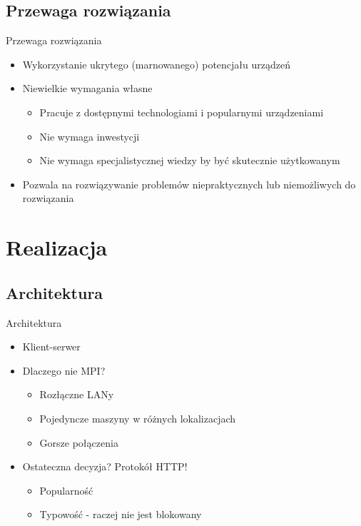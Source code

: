 \documentclass[12pt]{beamer}
\begin{document}
\subsection{Przewaga rozwiązania}
\begin{frame}{Przewaga rozwiązania}
\begin{itemize}
\item Wykorzystanie ukrytego (marnowanego) potencjału urządzeń
\item Niewielkie wymagania własne 
\begin{itemize}
	\item Pracuje z dostępnymi technologiami i popularnymi urządzeniami
	\item Nie wymaga inwestycji
	\item Nie wymaga specjalistycznej wiedzy by być skutecznie użytkowanym
\end{itemize}
\item Pozwala na rozwiązywanie problemów niepraktycznych lub niemożliwych do rozwiązania
\end{itemize}
\end{frame}

\section{Realizacja}
\subsection{Architektura}
\begin{frame}{Architektura}
\begin{itemize}
	\item Klient-serwer
	\item Dlaczego nie MPI?
	\begin{itemize}
		\item Rozłączne LANy
		\item Pojedyncze maszyny w różnych lokalizacjach
		\item Gorsze połączenia
	\end{itemize}
	\item Ostateczna decyzja? Protokół HTTP!
	\begin{itemize}
		\item Popularność
		\item Typowość - raczej nie jest blokowany
	\end{itemize}
\end{itemize}
\end{frame}
\end{document}
